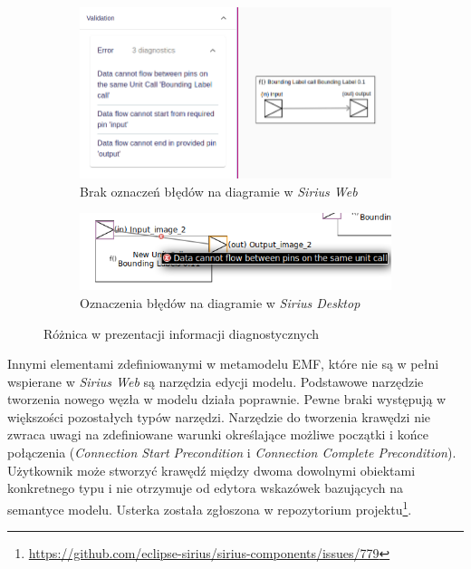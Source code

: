 \begin{figure}
	\centering
	\begin{subfigure}{.49\textwidth}
		\centering
		\includegraphics[width=.99\linewidth]{./images/sirius-web-semantic-validation-direction-and-no-loops-rules.png}
		\caption{Brak oznaczeń błędów na diagramie w \emph{Sirius
      Web}}\label{rys:validation-comparison-sirius-web}
	\end{subfigure}
  \begin{subfigure}{.49\textwidth}
		\centering
		\includegraphics[width=.99\linewidth]{./images/sirius-desktop-example-semantic-validation-rule-failure.png}
		\caption{Oznaczenia błędów na diagramie w \emph{Sirius
      Desktop}}\label{rys:validation-comparison-sirius-desktop}
	\end{subfigure}

	\caption{Różnica w prezentacji informacji diagnostycznych}
\end{figure}

Innymi elementami zdefiniowanymi w metamodelu \gls{EMF}, które nie są w pełni
wspierane w \emph{Sirius Web} są narzędzia edycji modelu. Podstawowe narzędzie
tworzenia nowego węzła w modelu działa poprawnie.
Pewne braki występują w większości pozostałych typów narzędzi. Narzędzie do
tworzenia krawędzi nie zwraca uwagi na zdefiniowane warunki określające możliwe
początki i końce połączenia (\emph{Connection Start Precondition} i
\emph{Connection Complete Precondition}). Użytkownik może stworzyć krawędź
między dwoma dowolnymi obiektami konkretnego typu i nie otrzymuje od edytora
wskazówek bazujących na semantyce modelu. Usterka została zgłoszona w
repozytorium projektu\footnote{
	\url{https://github.com/eclipse-sirius/sirius-components/issues/779}}.

